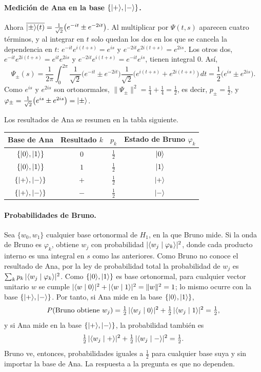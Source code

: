 \paragraph{Medición de Ana en la base $\{\lvert +\rangle,\lvert -\rangle\}$.} Ahora $\overline{\lvert \pm\rangle(t)}=\frac1{\sqrt2}\bigl(e^{-it}\pm e^{-2it}\bigr)$. Al multiplicar por $\Psi(t,s)$ aparecen cuatro términos, y al integrar en $t$ solo quedan los dos en los que se cancela la dependencia en $t$: $e^{-it}e^{i(t+s)}=e^{is}$ y $e^{-2it}e^{2i(t+s)}=e^{2is}$. Los otros dos, $e^{-it}e^{2i(t+s)}=e^{it}e^{2is}$ y $e^{-2it}e^{i(t+s)}=e^{-it}e^{is}$, tienen integral $0$. Así,
\[
  \Psi_\pm(s)=\frac1{2\pi}\int_0^{2\pi}\frac1{\sqrt2}\bigl(e^{-it}\pm e^{-2it}\bigr)\frac1{\sqrt2}\bigl(e^{i(t+s)}+e^{2i(t+s)}\bigr)\,dt=\frac12\bigl(e^{is}\pm e^{2is}\bigr).
\]
Como $e^{is}$ y $e^{2is}$ son ortonormales, $\|\Psi_\pm\|^2=\frac14+\frac14=\frac12$, es decir, $p_\pm=\frac12$, y $\varphi_\pm=\frac1{\sqrt2}\bigl(e^{is}\pm e^{2is}\bigr)=\lvert \pm\rangle$.

Los resultados de Ana se resumen en la tabla siguiente.
\begin{center}
\renewcommand{\arraystretch}{1.3}
\begin{tabular}{cccc}
  Base de Ana & Resultado $k$ & $p_k$ & Estado de Bruno $\varphi_k$\\\hline
  $\{\lvert 0\rangle,\lvert 1\rangle\}$ & $0$ & $\frac12$ & $\lvert 0\rangle$\\
  $\{\lvert 0\rangle,\lvert 1\rangle\}$ & $1$ & $\frac12$ & $\lvert 1\rangle$\\
  $\{\lvert +\rangle,\lvert -\rangle\}$ & $+$ & $\frac12$ & $\lvert +\rangle$\\
  $\{\lvert +\rangle,\lvert -\rangle\}$ & $-$ & $\frac12$ & $\lvert -\rangle$
\end{tabular}
\end{center}

\paragraph{Probabilidades de Bruno.} Sea $\{w_0,w_1\}$ cualquier base ortonormal de $H_1$, en la que Bruno mide. Si la onda de Bruno es $\varphi_k$, obtiene $w_j$ con probabilidad $|\langle w_j\mid \varphi_k\rangle|^2$, donde cada producto interno es una integral en $s$ como las anteriores. Como Bruno no conoce el resultado de Ana, por la ley de probabilidad total la probabilidad de $w_j$ es $\sum_k p_k\,|\langle w_j\mid \varphi_k\rangle|^2$. Como $\{\lvert 0\rangle,\lvert 1\rangle\}$ es base ortonormal, para cualquier vector unitario $w$ se cumple $|\langle w\mid 0\rangle|^2+|\langle w\mid 1\rangle|^2=\|w\|^2=1$; lo mismo ocurre con la base $\{\lvert +\rangle,\lvert -\rangle\}$. Por tanto, si Ana mide en la base $\{\lvert 0\rangle,\lvert 1\rangle\}$,
\[
  P(\text{Bruno obtiene } w_j)=\tfrac12\,|\langle w_j\mid 0\rangle|^2+\tfrac12\,|\langle w_j\mid 1\rangle|^2=\tfrac12 ,
\]
y si Ana mide en la base $\{\lvert +\rangle,\lvert -\rangle\}$, la probabilidad también es
\[
  \tfrac12\,|\langle w_j\mid +\rangle|^2+\tfrac12\,|\langle w_j\mid -\rangle|^2=\tfrac12 .
\]
Bruno ve, entonces, probabilidades iguales a $\frac12$ para cualquier base suya y sin importar la base de Ana. La respuesta a la pregunta es que no dependen.

